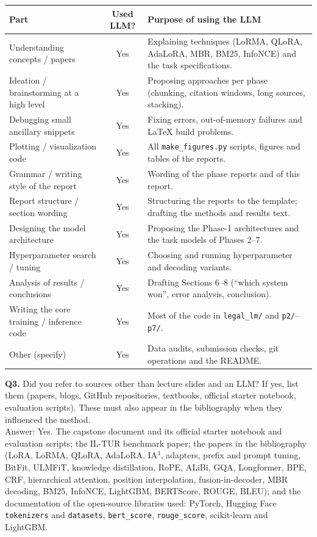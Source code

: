 \documentclass[11pt, oneside]{article}
\newcommand{\code}[1]{\texttt{\small #1}}
\begin{document}
\begin{table}[H]
\centering
\begin{tabular}{>{\raggedright\arraybackslash}p{4.6cm}|c|>{\raggedright\arraybackslash}p{7.2cm}}
\toprule
Part & Used LLM? & Purpose of using the LLM \\
\midrule
Understanding concepts / papers & Yes & Explaining techniques (LoRMA, QLoRA, AdaLoRA, MBR, BM25, InfoNCE) and the task specifications. \\
Ideation / brainstorming at a high level & Yes & Proposing approaches per phase (chunking, citation windows, long sources, stacking). \\
Debugging small ancillary snippets & Yes & Fixing errors, out-of-memory failures and LaTeX build problems. \\
Plotting / visualization code & Yes & All \code{make\_figures.py} scripts, figures and tables of the reports. \\
Grammar / writing style of the report & Yes & Wording of the phase reports and of this report. \\
Report structure / section wording & Yes & Structuring the reports to the template; drafting the methods and results text. \\
Designing the model architecture & Yes & Proposing the Phase-1 architectures and the task models of Phases 2--7. \\
Hyperparameter search / tuning & Yes & Choosing and running hyperparameter and decoding variants. \\
Analysis of results / conclusions & Yes & Drafting Sections 6--8 (``which system won'', error analysis, conclusion). \\
Writing the core training / inference code & Yes & Most of the code in \code{legal\_lm/} and \code{p2/}--\code{p7/}. \\
Other (specify) & Yes & Data audits, submission checks, git operations and the README. \\
\bottomrule
\end{tabular}
\end{table}

\medskip
\noindent
\textbf{Q3.} Did you refer to sources other than lecture slides and an LLM?
If yes, list them (papers, blogs, GitHub repositories, textbooks, official starter notebook, evaluation scripts). These must also appear in the bibliography when they influenced the method. \\[0.4em]
Answer: Yes.  The capstone document and its official starter notebook and evaluation scripts; the IL-TUR
benchmark paper; the papers in the bibliography (LoRA, LoRMA, QLoRA, AdaLoRA, IA$^3$, adapters, prefix and prompt
tuning, BitFit, ULMFiT, knowledge distillation, RoPE, ALiBi, GQA, Longformer, BPE, CRF, hierarchical attention,
position interpolation, fusion-in-decoder, MBR decoding, BM25, InfoNCE, LightGBM, BERTScore, ROUGE, BLEU); and the
documentation of the open-source libraries used: PyTorch, Hugging Face \code{tokenizers} and \code{datasets},
\code{bert\_score}, \code{rouge\_score}, scikit-learn and LightGBM.
\end{document}
